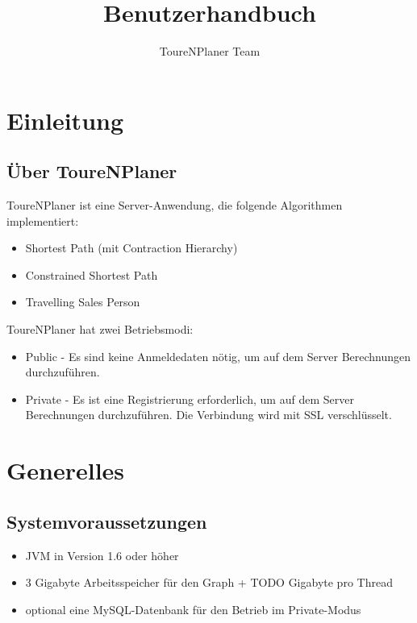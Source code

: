 \documentclass[ngerman,titlepage,parskip=true]{scrartcl}
\title{Benutzerhandbuch}
\author{ToureNPlaner Team}
\begin{document}
\maketitle

\tableofcontents

\pagebreak

\section{Einleitung}

	\subsection{\"Uber ToureNPlaner}
   ToureNPlaner ist eine Server-Anwendung, die folgende Algorithmen implementiert:
   \begin{itemize}
     \item Shortest Path (mit Contraction Hierarchy)
     \item Constrained Shortest Path
     \item Travelling Sales Person
   \end{itemize}
   ToureNPlaner hat zwei Betriebsmodi:
   \begin{itemize}
     \item Public - Es sind keine Anmeldedaten n\"otig, um auf dem Server Berechnungen durchzuf\"uhren.
     \item Private - Es ist eine Registrierung erforderlich, um auf dem Server Berechnungen durchzuf\"uhren. Die Verbindung wird mit SSL verschl\"usselt.
   \end{itemize}


\section{Generelles}
	\subsection{Systemvoraussetzungen}
	
	\begin{itemize}
		\item JVM in Version 1.6 oder h\"oher
		\item 3 Gigabyte Arbeitsspeicher f\"ur den Graph + TODO Gigabyte pro Thread
		\item optional eine MySQL-Datenbank f\"ur den Betrieb im Private-Modus
	\end{itemize}
\end{document}
